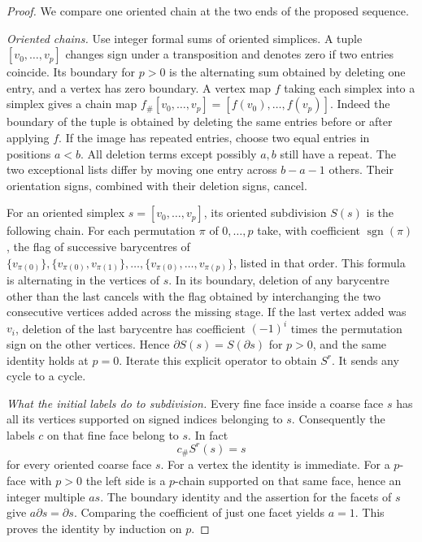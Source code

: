 \begin{proof}
We compare one oriented chain at the two ends of the proposed sequence.

\noindent\textit{Oriented chains.}
Use integer formal sums of oriented simplices. A tuple
$[v_0,\ldots,v_p]$ changes sign under a transposition and denotes zero
if two entries coincide. Its boundary for $p>0$ is the alternating sum
obtained by deleting one entry, and a vertex has zero boundary.
A vertex map $f$ taking each simplex into a simplex gives a chain map
$f_\#[v_0,\ldots,v_p]=[f(v_0),\ldots,f(v_p)]$. Indeed the
boundary of the tuple is obtained by deleting the same entries before
or after applying $f$. If the image has repeated entries, choose two
equal entries in positions $a<b$. All deletion terms except possibly
$a,b$ still have a repeat. The two exceptional lists differ by moving
one entry across $b-a-1$ others. Their orientation signs, combined
with their deletion signs, cancel.

For an oriented simplex $s=[v_0,\ldots,v_p]$, its oriented subdivision
$S(s)$ is the following chain. For each permutation $\pi$ of
$0,\ldots,p$ take, with coefficient $\operatorname{sgn}(\pi)$, the
flag of successive barycentres of
$\{v_{\pi(0)}\},\{v_{\pi(0)},v_{\pi(1)}\},\ldots,
\{v_{\pi(0)},\ldots,v_{\pi(p)}\}$, listed in that order. This formula
is alternating in the vertices of $s$. In its boundary, deletion of
any barycentre other than the last cancels with the flag obtained by
interchanging the two consecutive vertices added across the missing
stage. If the last vertex added was $v_i$, deletion of the last
barycentre has coefficient $(-1)^i$ times the permutation sign on
the other vertices. Hence $\partial S(s)=S(\partial s)$ for $p>0$,
and the same identity holds at $p=0$. Iterate this explicit operator
to obtain $S^r$. It sends any cycle to a cycle.

\par\smallskip\noindent\textit{What the initial labels do to subdivision.}\enspace
Every fine face inside a coarse face $s$ has all its vertices supported
on signed indices belonging to $s$. Consequently the labels $c$ on
that fine face belong to $s$. In fact
\[
                          c_\# S^r(s)=s
\]
for every oriented coarse face $s$. For a vertex the identity is
immediate. For a $p$-face with $p>0$ the left side is a $p$-chain
supported on that same face, hence an integer multiple $a s$.
The boundary identity and the assertion for the facets of $s$ give
$a\partial s=\partial s$. Comparing the coefficient of just one
facet yields $a=1$. This proves the identity by induction on $p$.


\end{proof}
